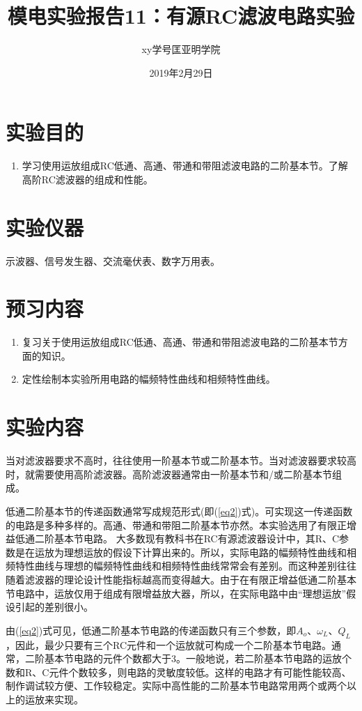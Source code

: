 \documentclass[a4paper]{article}
\title{模电实验报告11：有源RC滤波电路实验}
\author{xy\quad 学号\quad 匡亚明学院}
\date{2019年2月29日}
\begin{document}
\maketitle


\section{实验目的}
\begin{enumerate}
\item 学习使用运放组成RC低通、高通、带通和带阻滤波电路的二阶基本节。了解高阶RC滤波器的组成和性能。
\end{enumerate}

\section{实验仪器}
示波器、信号发生器、交流毫伏表、数字万用表。

\section{预习内容}
\begin{enumerate}
\item 复习关于使用运放组成RC低通、高通、带通和带阻滤波电路的二阶基本节方面的知识。
\item 定性绘制本实验所用电路的幅频特性曲线和相频特性曲线。
\end{enumerate}

\section{实验内容}
当对滤波器要求不高时，往往使用一阶基本节或二阶基本节。当对滤波器要求较高时，就需要使用高阶滤波器。高阶滤波器通常由一阶基本节和/或二阶基本节组成。

低通二阶基本节的传递函数通常写成规范形式(即(\ref{eq2})式)。可实现这一传递函数的电路是多种多样的。高通、带通和带阻二阶基本节亦然。本实验选用了有限正增益低通二阶基本节电路。
大多数现有教科书在RC有源滤波器设计中，其R、C参数是在运放为理想运放的假设下计算出来的。所以，实际电路的幅频特性曲线和相频特性曲线与理想的幅频特性曲线和相频特性曲线常常会有差别。而这种差别往往随着滤波器的理论设计性能指标越高而变得越大。由于在有限正增益低通二阶基本节电路中，运放仅用于组成有限增益放大器，所以，在实际电路中由“理想运放”假设引起的差别很小。

由(\ref{eq2})式可见，低通二阶基本节电路的传递函数只有三个参数，即$A_o$、$\omega_L$、$Q_L$，因此，最少只要有三个RC元件和一个运放就可构成一个二阶基本节电路。通常，二阶基本节电路的元件个数都大于3。一般地说，若二阶基本节电路的运放个数和R、C元件个数较多，则电路的灵敏度较低。这样的电路才有可能性能较高、制作调试较方便、工作较稳定。实际中高性能的二阶基本节电路常用两个或两个以上的运放来实现。
\end{document}

